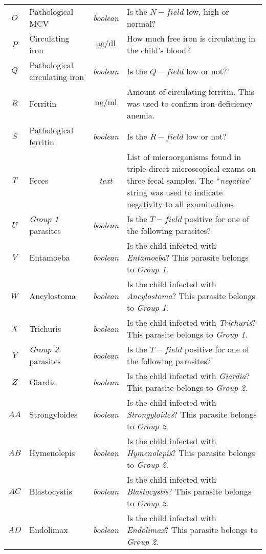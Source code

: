 \begin{footnotesize}
\begin{longtable}{C{.09\mylength} p{.25\mylength} C{.20\mylength} p{.40\mylength}}
		$O$ & Pathological MCV & \textit{boolean} & Is the $N-field$ low, high or normal?\\
		$P$ & Circulating iron & $\si{\micro\gram}/\si{\deci\litre}$ & How much free iron is circulating in the child's blood?\\
		$Q$ & Pathological circulating iron & \textit{boolean} & Is the $Q-field$ low or not?\\
		$R$ & Ferritin & $\si{\nano\gram}/\si{\milli\litre}$ & Amount of circulating ferritin. This was used to confirm iron-deficiency anemia.\\
		$S$ & Pathological ferritin & \textit{boolean} & Is the $R-field$ low or not?\\
		$T$ & Feces & \textit{text} & List of microorganisms found in triple direct microscopical exams on three fecal samples. The ``\textit{negative}" string was used to indicate negativity to all examinations.\\
		$U$ & \textit{Group 1} parasites & \textit{boolean} & Is the $T-field$ positive for one of the following parasites?\\
		$V$ & Entamoeba & \textit{boolean} & Is the child infected with \textit{Entamoeba}? This parasite belongs to \textit{Group 1}.\\
		$W$ & Ancylostoma & \textit{boolean} & Is the child infected with \textit{Ancylostoma}? This parasite belongs to \textit{Group 1}.\\
		$X$ & Trichuris & \textit{boolean} & Is the child infected with \textit{Trichuris}? This parasite belongs to \textit{Group 1}.\\
		$Y$ & \textit{Group 2} parasites & \textit{boolean} & Is the $T-field$ positive for one of the following parasites?\\
		$Z$ & Giardia & \textit{boolean} & Is the child infected with \textit{Giardia}? This parasite belongs to \textit{Group 2}.\\
		$AA$ & Strongyloides & \textit{boolean} & Is the child infected with \textit{Strongyloides}? This parasite belongs to \textit{Group 2}.\\
		$AB$ & Hymenolepis & \textit{boolean} & Is the child infected with \textit{Hymenolepis}? This parasite belongs to \textit{Group 2}.\\
		$AC$ &  Blastocystis & \textit{boolean} & Is the child infected with \textit{Blastocystis}? This parasite belongs to \textit{Group 2}.\\
		$AD$ & Endolimax & \textit{boolean} & Is the child infected with \textit{Endolimax}? This parasite belongs to \textit{Group 2}.\\

\end{longtable}
\end{footnotesize}
